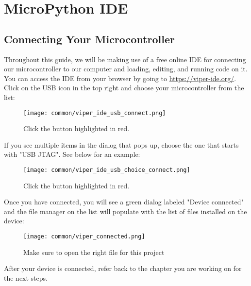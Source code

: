 \chapter{MicroPython IDE} \label{ide}

\section{Connecting Your Microcontroller}
Throughout this guide, we will be making use of a free online IDE for connecting our microcontroller
to our computer and loading, editing, and running code on it. You can access the IDE from your browser
by going to \url{https://viper-ide.org/}. Click on the USB icon in the top right and choose your
microcontroller from the list:

\begin{figure}[H]
    \centering
    \texttt{[image: common/viper\_ide\_usb\_connect.png]}
    \caption{Click the button highlighted in red.}
\end{figure}

If you see multiple items in the dialog that pops up, choose the one that starts with "USB JTAG". See below for an example:
\begin{figure}[H]
    \centering
    \texttt{[image: common/viper\_ide\_usb\_choice\_connect.png]}
    \caption{Click the button highlighted in red.}
\end{figure}

Once you have connected, you will see a green dialog labeled "Device connected" and the file manager on the list
will populate with the list of files installed on the device:
\begin{figure}[H]
    \centering
    \texttt{[image: common/viper\_connected.png]}
    \caption{Make sure to open the right file for this project}
\end{figure}

After your device is connected, refer back to the chapter you are working on for the next steps.

